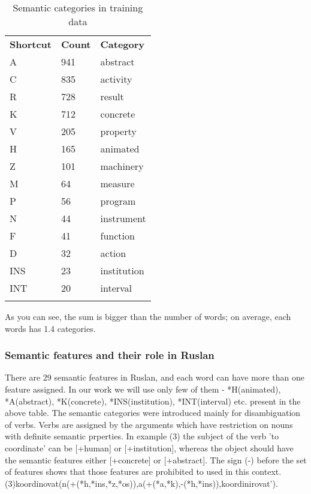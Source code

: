 \documentclass[letterpaper]{article}
\begin{document}
\begin{table}
\begin{tabular}{|l|l|l|}
 \hline
\textbf{Shortcut} &  \textbf{Count} & \textbf{Category}\\
A & 941 & abstract \\ \hline
C & 835 & activity \\ \hline
R & 728 & result \\ \hline
K & 712 & concrete \\ \hline
V & 205 & property \\ \hline
H & 165 & animated \\ \hline
Z & 101 & machinery \\ \hline
M & 64 & measure\\ \hline
P & 56 & program \\ \hline
N & 44 & instrument \\ \hline
F & 41 & function \\ \hline
D & 32 & action \\ \hline
INS & 23 & institution \\ \hline
INT & 20 & interval \\ 
\hline
\caption{Semantic categories in training data}
\end{tabular}
\end{table}

As you can see, the sum is bigger than the number of words; on average, each words has 1.4 categories.


\subsubsection{Semantic features and their role in Ruslan}
There are 29 semantic features in Ruslan, and each word can have more than one
feature assigned. In our work we will use only few of them - *H(animated), *A(abstract),
*K(concrete), *INS(institution), *INT(interval) etc. present in the above table.
The semantic categories were introduced mainly for disambiguation of verbs.
Verbs are assigned by the arguments which have restriction on nouns with definite semantic prperties. In example (3)
the subject of the verb 'to coordinate' can be [+human] or [+institution], whereas
the object should have the semantic features either [+concrete] or [+abstract]. The sign (-)
before the set of features shows that those features are prohibited to used in this context.
(3)koordinovat(n(+(*h,*ins,*z,*os)),a(+(*a,*k),-(*h,*ins)),koordinirovat').
\end{document}

